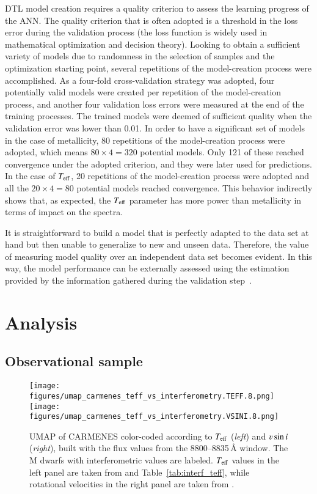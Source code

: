 \documentclass{aa}
\begin{document}
DTL model creation requires a quality criterion to assess the learning progress of the ANN. The quality criterion that is often adopted is a threshold in the loss error during the validation process (the loss function is widely used in mathematical optimization and decision theory). Looking to obtain a sufficient variety of models due to randomness in the selection of samples and the optimization starting point, several repetitions of the model-creation process were accomplished.
As a four-fold cross-validation strategy was adopted, four potentially valid models were created per repetition of the model-creation process, and another four validation loss errors were measured at the end of the training processes. The trained models were deemed of sufficient quality when the validation error was lower than 0.01. In order to have a significant set of models in the case of metallicity, 80 repetitions of the model-creation process were adopted, which means $80 \times 4 = 320$ potential models. 
Only 121 of these reached convergence under the adopted criterion, and they were later used for predictions. In the case of $T_{\rm eff}$, 20 repetitions of the model-creation process were adopted and all the $20 \times 4 = 80$ potential models reached convergence. This behavior indirectly shows that, as expected, the $T_{\rm eff}$ parameter has more power than metallicity in terms of impact on the spectra.


It is straightforward to build a model that is perfectly adapted to the data set at hand but then unable to generalize to new and unseen data. 
Therefore, the value of measuring model quality over an independent data set becomes evident.
In this way, the model performance can be externally assessed using the estimation provided by the information gathered during the validation step~\citep{vabalas2019machine}.


\section{Analysis}
\label{Analysis}

\subsection{Observational sample}
\label{Analysis.Sample}

\begin{figure*}
    \centering
    \texttt{[image: figures/umap\_carmenes\_teff\_vs\_interferometry.TEFF.8.png]}
    \hspace{0.5cm}
    \texttt{[image: figures/umap\_carmenes\_teff\_vs\_interferometry.VSINI.8.png]}
    \caption{UMAP of CARMENES color-coded according to $T_{\rm eff}$ ({\it left}) and $\varv\sin{i}$ ({\it right}), built with the flux values from the 8800--8835\,{\AA} window. 
    The M dwarfs with interferometric values are labeled. 
    $T_{\rm eff}$ values
    in the left panel {are taken} from \cite{Schweitzer2019} and Table~\ref{tab:interf_teff},  while rotational velocities in the right panel {are taken} from \cite{Passegger2019}.}
    \label{fig:umap_teff_carmenes_interf}
\end{figure*}
\end{document}
